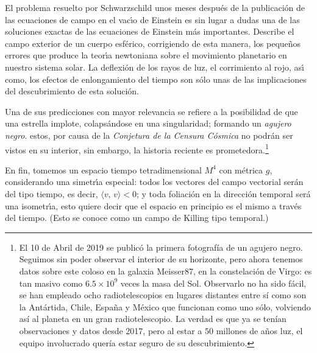 \documentclass[12pt]{article}
\begin{document}
\noindent
El problema resuelto por Schwarzschild unos meses despu\'es de la publicaci\'on de las ecuaciones de campo en el vac\'{\i}o de Einstein es sin lugar a dudas una de las soluciones exactas de las ecuaciones de Einstein m\'as importantes.
Describe el campo exterior de un cuerpo esf\'erico, corrigiendo de esta manera, los peque\~nos errores que produce la teor\'{\i}a newtoniana sobre el movimiento planetario en nuestro sistema solar. La deflexi\'on de los rayos de luz, el corrimiento al rojo, as\'{\i} como, los efectos de enlongamiento del tiempo son s\'olo unas de las implicaciones del descubrimiento de esta soluci\'on.

Una de sus predicciones con mayor relevancia se refiere a la posibilidad de que una estrella implote, colaps\'andose en una singularidad; formando un \textit{agujero negro}. estos, por causa de la \textit{Conjetura de la Censura Cósmica} no podrán ser vistos en su interior, sin embargo, la historia reciente es prometedora.\footnote{El 10 de Abril de 2019 se publicó la primera fotografía de un agujero negro. Seguimos sin poder observar el interior de su horizonte, pero ahora tenemos datos sobre este coloso en la galaxia Meisser87, en la constelación de Virgo: es tan masivo como $6.5 \times 10^9$ veces la masa del Sol. Observarlo no ha sido fácil, se han empleado ocho radiotelescopios en lugares distantes entre sí como son la Antártida, Chile, España y México que funcionan como uno sólo, volviendo así al planeta en un gran radiotelescopio. La verdad es que ya se tenían observaciones y datos desde 2017, pero al estar a $50$ millones de años luz, el equipo involucrado quería estar seguro de su descubrimiento.}

En fin, tomemos un espacio tiempo tetradimensional $M^4$ con m\'etrica $g$, considerando una simetr\'{\i}a especial: todos los vectores del campo vectorial ser\'an del tipo tiempo, es decir, $\langle v,\,v\rangle < 0$; y toda foliaci\'on en la direcci\'on temporal ser\'a una isometr\'{\i}a, esto quiere decir que el espacio en principio es el mismo a trav\'es del tiempo. (Esto se conoce como un campo de Killing tipo temporal.)
\end{document}

